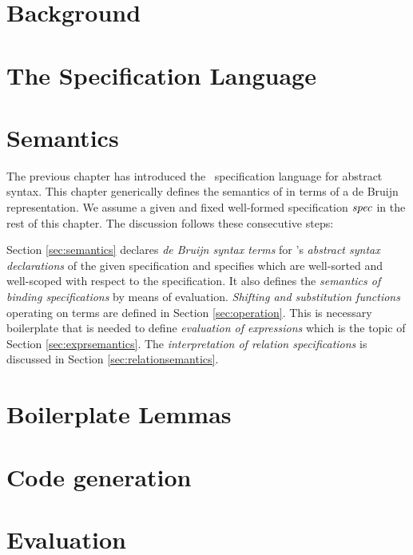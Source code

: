 
\chapter{Background}\label{ch:gen:background}



\chapter{The \Knot Specification Language}\label{ch:knotsyntax}


\chapter{Semantics}\label{ch:knotsemantics}

The previous chapter has introduced the \Knot~specification language for
abstract syntax. This chapter generically defines the semantics of \Knot in
terms of a de Bruijn representation. We assume a given and fixed well-formed
specification $\mathit{spec}$ in the rest of this chapter. The discussion follows these
consecutive steps:

Section \ref{sec:semantics} declares \emph{de Bruijn syntax terms} for \Knot's
\emph{abstract syntax declarations} of the given specification and specifies
which are well-sorted and well-scoped with respect to the specification. It also
defines the \emph{semantics of binding specifications} by means of evaluation.
\emph{Shifting and substitution functions} operating on terms are defined in
Section \ref{sec:operation}. This is necessary boilerplate that is needed to
define \emph{evaluation of expressions} which is the topic of Section
\ref{sec:exprsemantics}. The \emph{interpretation of relation specifications} is
discussed in Section \ref{sec:relationsemantics}.





\chapter{Boilerplate Lemmas}\label{ch:elaboration}




\chapter{Code generation}\label{ch:codegen}


\chapter{Evaluation}





